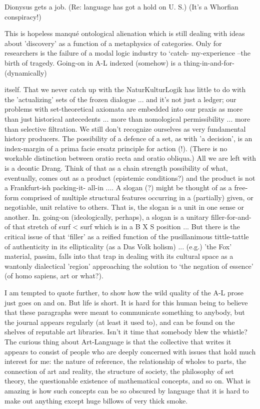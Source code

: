  Dionysus gets a job. (Re: language has got a hold on U. S.) (It's a Whorfian conspiracy!)

  This is hopeless manqué ontological alienation which is still dealing with ideas
  about 'discovery' as a function of a metaphysics of categories. Only for researchers
  is the failure of a modal logic industry to `catch- my-experience --the birth of
  tragedy.
       Going-on in A-L indexed (somehow) is a thing-in-and-for-(dynamically)




   itself. That we never catch up with the NaturKulturLogik has little to do with the
   'actualizing' sets of the frozen dialogue ... and it's not just a ledger; our problems
   with set-theoretical axiomata are embedded into our praxis as more than just
   historical antecedents ... more than nomological permissibility ... more than
   selective filtration. We still don't recognize ourselves as very fundamental history
   producers.
            The possibility of a defence of a set, as with 'a decision', is an index-margin
   of a prima facie ersatz principle for action (!). (There is no workable distinction
   between oratio recta and oratio obliqua.) All we are left with is a deontic Drang.
   Think of that as a chain strength possibility of what, eventually, comes out as a
   product (epistemic conditions?) and the product is not a Frankfurt-ish packing-it-
   all-in .... A slogan (?) might be thought of as a free-form comprised of multiple
   structural features occurring in a (partially) given, or negotiable, unit relative to
   others. That is, the slogan is a unit in one sense or another. In. going-on
   (ideologically, perhaps), a slogan is a unitary filler-for-and-of that stretch of surf <
   surf which is in a B X S position ... But there is the critical issue of that `filler' as a
   reified function of the pusillanimous tittle-tattle of authenticity in its ellipticality (as
   a Das Volk holism) ... (e.g.) 'the Fox' material, passim, falls into that trap in dealing
   with its cultural space as a wantonly dialectical 'region' approaching the solution to
   `the negation of essence' (of homo sapiens, art or what?).

         I am tempted to quote further, to show how the wild quality of the A-L prose just
goes on and on. But life is short. It is hard for this human being to believe that these
paragraphs were meant to communicate something to anybody, but the journal appears
regularly (at least it used to), and can be found on the shelves of reputable art libraries.
Isn't it time that somebody blew the whistle? The curious thing about Art-Language is
that the collective that writes it appears to consist of people who are deeply concerned
with issues that hold much interest for me: the nature of reference, the relationship of
wholes to parts, the connection of art and reality, the structure of society, the philosophy
of set theory, the questionable existence of mathematical concepts, and so on. What is
amazing is how such concepts can be so obscured by language that it is hard to make out
anything except huge billows of very thick smoke.

